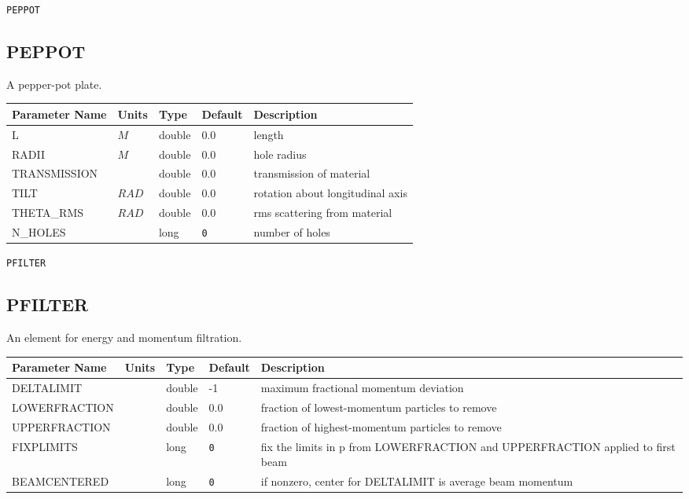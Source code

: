 \begin{latexonly}
\newpage
\begin{center}{\Large\verb|PEPPOT|}\end{center}
\end{latexonly}\subsection{PEPPOT}
A pepper-pot plate.
\\
\begin{tabular}{|l|l|l|l|p{\descwidth}|} \hline
Parameter Name & Units & Type & Default & Description \\ \hline 
L & $M$ & double &  0.0 & length  \\ \hline 
RADII & $M$ & double &  0.0 & hole radius  \\ \hline 
TRANSMISSION &  & double &  0.0 & transmission of material  \\ \hline 
TILT & $RAD$ & double &  0.0 & rotation about longitudinal axis  \\ \hline 
THETA\_RMS & $RAD$ & double &  0.0 & rms scattering from material  \\ \hline 
N\_HOLES &  & long &  \verb|0| & number of holes  \\ \hline 
\end{tabular}

\begin{latexonly}
\newpage
\begin{center}{\Large\verb|PFILTER|}\end{center}
\end{latexonly}\subsection{PFILTER}
An element for energy and momentum filtration.
\\
\begin{tabular}{|l|l|l|l|p{\descwidth}|} \hline
Parameter Name & Units & Type & Default & Description \\ \hline 
DELTALIMIT &  & double &   -1 & maximum fractional momentum deviation  \\ \hline 
LOWERFRACTION &  & double &  0.0 & fraction of lowest-momentum particles to remove  \\ \hline 
UPPERFRACTION &  & double &  0.0 & fraction of highest-momentum particles to remove  \\ \hline 
FIXPLIMITS &  & long &  \verb|0| & fix the limits in p from LOWERFRACTION and UPPERFRACTION applied to first beam  \\ \hline 
BEAMCENTERED &  & long &  \verb|0| & if nonzero, center for DELTALIMIT is average beam momentum  \\ \hline 
\end{tabular}

